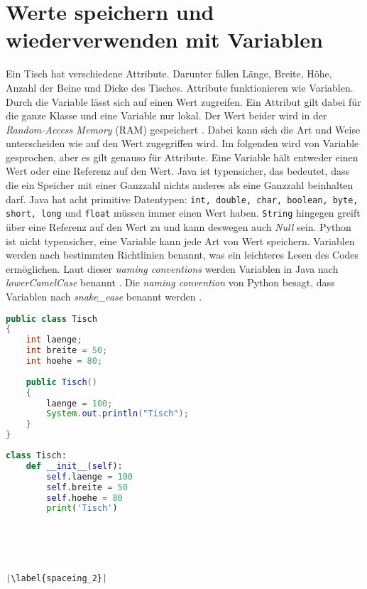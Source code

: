 \section{Werte speichern und wiederverwenden mit Variablen}\label{wsuwmv}
Ein Tisch hat verschiedene Attribute. Darunter fallen Länge, Breite, Höhe, Anzahl der Beine und Dicke des Tisches. Attribute funktionieren wie Variablen.  Durch die Variable lässt sich auf einen Wert zugreifen. Ein Attribut gilt dabei für die ganze Klasse und eine Variable nur lokal. Der Wert beider wird in der \textit{Random-Access Memory} (RAM) gespeichert \cite{Louis:2010}. Dabei kann sich die Art und Weise unterscheiden wie auf den Wert zugegriffen wird. Im folgenden wird von Variable gesprochen, aber es gilt genauso für Attribute. Eine Variable hält entweder einen Wert oder eine Referenz auf den Wert. Java ist typensicher, das bedeutet, dass die ein Speicher mit einer Ganzzahl nichts anderes als eine Ganzzahl beinhalten darf. Java hat acht primitive Datentypen: \texttt{int, double, char, boolean, byte, short, long} und \texttt{float} müssen immer einen Wert haben. \texttt{String} hingegen greift über eine Referenz auf den Wert zu und kann deswegen auch \textit{Null} sein. Python ist nicht typensicher, eine Variable kann jede Art von Wert speichern. Variablen werden nach bestimmten Richtlinien benannt, was ein leichteres Lesen des Codes ermöglichen. Laut dieser \textit{naming conventions} werden Variablen in Java nach \textit{lowerCamelCase} benannt \cite{Microsoft:CapCon}. Die \textit{naming convention} von Python besagt, dass Variablen nach \textit{snake\_case} benannt werden \cite{Ims:h-s}. \cite{JavaNC}\cite{PythonStyle}\cite{JVMS}

\begin{minipage}{.5\linewidth}
\begin{lstlisting}[language=java,caption={Attribute/Variablen in Java},captionpos=b,label={lst:java:variablen},frame=none,escapechar=|]
public class Tisch
{
    int laenge;
    int breite = 50;
    int hoehe = 80;
    
    public Tisch()
    {
        laenge = 100;
        System.out.println("Tisch");
    }
}
\end{lstlisting}
\end{minipage}
\begin{minipage}{.5\linewidth}
\begin{lstlisting}[language=python,caption={Attribute/Variablen in Python},captionpos=b,label={lst:python:variablen},frame=l,escapechar=|]
class Tisch:
    def __init__(self):
        self.laenge = 100
        self.breite = 50
        self.hoehe = 80
        print('Tisch')





|\label{spaceing_2}|
\end{lstlisting}
\end{minipage}

